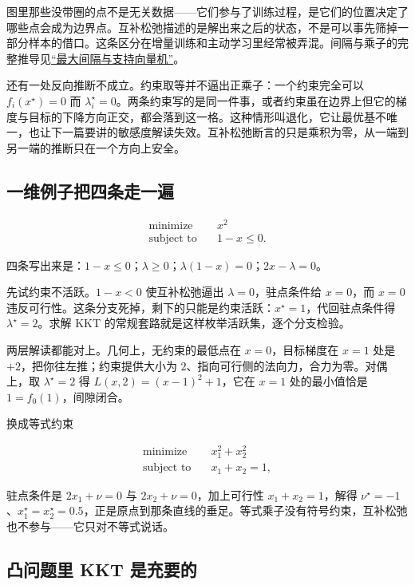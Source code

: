 图里那些没带圈的点不是无关数据——它们参与了训练过程，是它们的位置决定了哪些点会成为边界点。互补松弛描述的是解出来之后的状态，不是可以事先筛掉一部分样本的借口。这条区分在增量训练和主动学习里经常被弄混。间隔与乘子的完整推导见\hyperref[sec:09-Convex-Optimization/07-Applications/03]{``最大间隔与支持向量机''}。

还有一处反向推断不成立。约束取等并不逼出正乘子：一个约束完全可以 \(f_i(x^\star)=0\) 而 \(\lambda_i^\star=0\)。两条约束写的是同一件事，或者约束虽在边界上但它的梯度与目标的下降方向正交，都会落到这一格。这种情形叫退化，它让最优基不唯一，也让下一篇要讲的敏感度解读失效。互补松弛断言的只是乘积为零，从一端到另一端的推断只在一个方向上安全。

\subsection{一维例子把四条走一遍}

\[
\begin{aligned}
\text{minimize}\quad&x^2\\
\text{subject to}\quad&1-x\le0.
\end{aligned}
\]

四条写出来是：\(1-x\le0\)；\(\lambda\ge0\)；\(\lambda(1-x)=0\)；\(2x-\lambda=0\)。

先试约束不活跃。\(1-x<0\) 使互补松弛逼出 \(\lambda=0\)，驻点条件给 \(x=0\)，而 \(x=0\) 违反可行性。这条分支死掉，剩下的只能是约束活跃：\(x^\star=1\)，代回驻点条件得 \(\lambda^\star=2\)。求解 KKT 的常规套路就是这样枚举活跃集，逐个分支检验。

两层解读都能对上。几何上，无约束的最低点在 \(x=0\)，目标梯度在 \(x=1\) 处是 \(+2\)，把你往左推；约束提供大小为 \(2\)、指向可行侧的法向力，合力为零。对偶上，取 \(\lambda^\star=2\) 得 \(L(x,2)=(x-1)^2+1\)，它在 \(x=1\) 处的最小值恰是 \(1=f_0(1)\)，间隙闭合。

换成等式约束

\[
\begin{aligned}
\text{minimize}\quad&x_1^2+x_2^2\\
\text{subject to}\quad&x_1+x_2=1,
\end{aligned}
\]

驻点条件是 \(2x_1+\nu=0\) 与 \(2x_2+\nu=0\)，加上可行性 \(x_1+x_2=1\)，解得 \(\nu^\star=-1\)、\(x_1^\star=x_2^\star=0.5\)，正是原点到那条直线的垂足。等式乘子没有符号约束，互补松弛也不参与——它只对不等式说话。

\subsection{凸问题里 KKT 是充要的}

